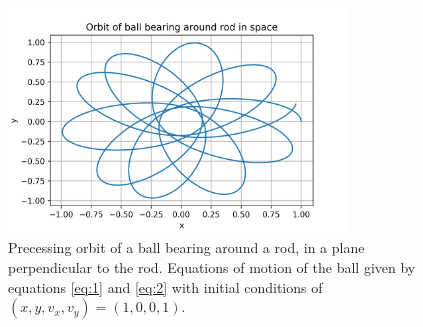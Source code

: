 \documentclass{article}
\begin{document}
\begin{figure}[H]
	\centering
	\includegraphics[width=0.8\textwidth]{../images/q1_orbit.png}
	\caption{Precessing orbit of a ball bearing around a rod, in a plane perpendicular to the rod. Equations of motion of the ball given by equations \ref{eq:1} and \ref{eq:2} with initial conditions of $(x,y,v_x,v_y)=(1,0,0,1)$.}
	\label{fig:q1_orbit}
\end{figure}
\end{document}

